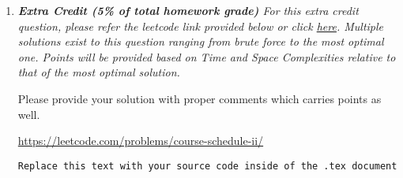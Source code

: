 \documentclass[12pt]{article}
\begin{document}
\begin{enumerate}
	\clearpage
	\item{\itshape \textbf{Extra Credit (5\% of total homework grade)}
    For this extra credit question, please refer the leetcode link provided below or click \href{https://leetcode.com/problems/course-schedule-ii/}{here}. Multiple solutions exist to this question ranging from brute force to the most optimal one. Points will be provided based on Time and Space Complexities relative to that of the most optimal solution.

    Please provide your solution with proper comments which carries points as well.}
    
   \url{https://leetcode.com/problems/course-schedule-ii/}

\begin{verbatim}
Replace this text with your source code inside of the .tex document
\end{verbatim}	
	
\end{enumerate}
\end{document}
